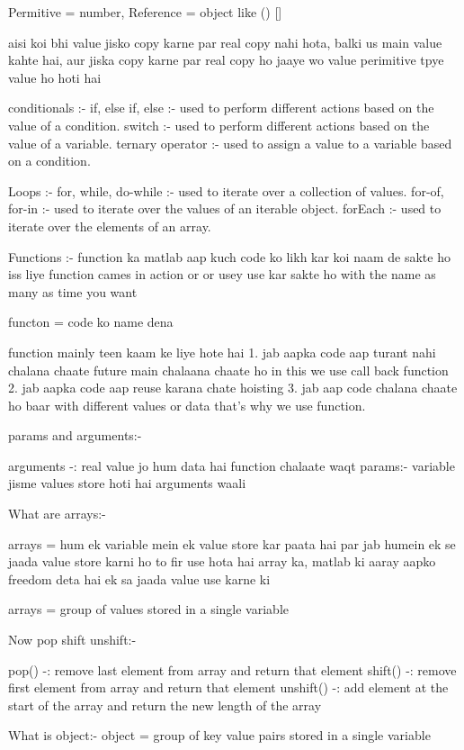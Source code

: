 Permitive = number,
Reference = object like () [] {} 

aisi koi bhi value jisko copy karne par real copy nahi hota, balki us main value kahte hai, aur jiska copy karne par real copy ho jaaye wo value perimitive tpye value ho hoti hai 

conditionals :- 
if, else if, else :- used to perform different actions based on the value of a condition.
switch :- used to perform different actions based on the value of a variable.
ternary operator :- used to assign a value to a variable based on a condition.

Loops :- 
for, while, do-while :- used to iterate over a collection of values.
for-of, for-in :- used to iterate over the values of an iterable object.
forEach :- used to iterate over the elements of an array.

Functions :-
function ka matlab aap kuch code ko likh kar koi naam de sakte ho iss liye function cames in action or or usey use kar sakte ho with the name as many as time you want 

functon = code ko name dena 

function mainly teen kaam ke liye hote hai
1. jab aapka code aap turant nahi chalana chaate future main chalaana chaate ho 
in this we use call back function 
2. jab aapka code aap reuse karana chate hoisting
3. jab aap code chalana chaate ho baar with different values or data 
that's why we use function.

params and arguments:-

arguments -: real value jo hum data hai function chalaate waqt 
params:- variable jisme values store hoti hai arguments waali

What are arrays:-

arrays = hum ek variable mein ek value store kar paata hai par jab humein ek se jaada value store karni ho to fir use hota hai array ka, matlab ki aaray aapko freedom deta hai ek sa jaada value use karne ki

arrays = group of values stored in a single variable

Now pop shift unshift:-

pop() -: remove last element from array and return that element
shift() -: remove first element from array and return that element
unshift() -: add element at the start of the array and return the new length of the array 

What is object:-
object = group of key value pairs stored in a single variable

